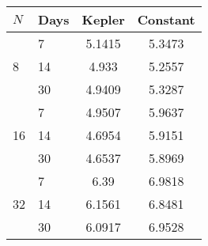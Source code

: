 \begin{tabular}{l|lcc}
\hline
$N$ & Days & Kepler & Constant \\
\hline
\multirow{3}{*}{8} & 7 & 5.1415 & 5.3473 \\ 
                   & 14 & 4.933 & 5.2557 \\ 
                   & 30 & 4.9409 & 5.3287 \\ \hline
\multirow{3}{*}{16} & 7 & 4.9507 & 5.9637 \\ 
                    &14 & 4.6954 & 5.9151 \\ 
                    &30 & 4.6537 & 5.8969 \\ \hline
\multirow{3}{*}{32} & 7 & 6.39 & 6.9818 \\ 
                    & 14 & 6.1561 & 6.8481 \\ 
                    & 30 & 6.0917 & 6.9528 \\ \hline
\end{tabular}
                    